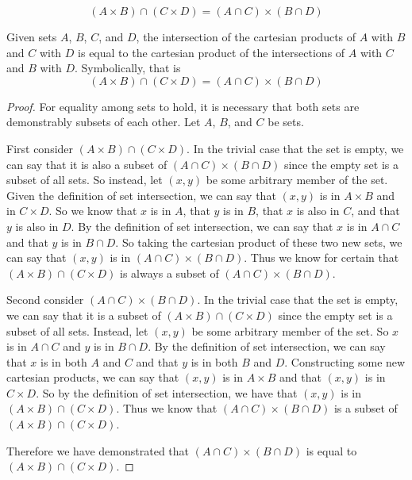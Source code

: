 \documentclass[main.tex]{subfiles}
\begin{document}
\subproblem{}\label{2n}
\[(A \times B) \cap (C \times D) = (A \cap C) \times (B \cap D)\]
\begin{thm}
	Given sets \(A\), \(B\), \(C\), and \(D\), the intersection of the
	cartesian products of \(A\) with \(B\) and \(C\) with \(D\) is equal to
	the cartesian product of the intersections of \(A\) with \(C\) and \(B\)
	with \(D\). Symbolically, that is
	\[(A \times B) \cap (C \times D) = (A \cap C) \times (B \cap D)\]
\end{thm}
\begin{proof}
	For equality among sets to hold, it is necessary that both sets are
	demonstrably subsets of each other. Let \(A\), \(B\), and \(C\) be sets.

	\medskip
	First consider \((A \times B) \cap (C \times D)\). In the trivial case
	that the set is empty, we can say that it is also a subset of
	\((A \cap C) \times (B \cap D)\) since the empty set is a subset of all
	sets. So instead, let \((x,y)\) be some arbitrary member of the set.
	Given the definition of set intersection, we can say that \((x,y)\) is
	in \(A \times B\) and in \(C \times D\). So we know that \(x\) is in
	\(A\), that \(y\) is in \(B\), that \(x\) is also in \(C\), and that
	\(y\) is also in \(D\). By the definition of set intersection, we can
	say that \(x\) is in \(A \cap C\) and that \(y\) is in \(B \cap D\).
	So taking the cartesian product of these two new sets, we can say that
	\((x,y)\) is in \((A \cap C) \times (B \cap D)\). Thus we know for
	certain that \((A \times B) \cap (C \times D)\) is always a subset of
	\((A \cap C) \times (B \cap D)\).

	\medskip
	Second consider \((A \cap C) \times (B \cap D)\). In the trivial case
	that the set is empty, we can say that it is a subset of
	\((A \times B) \cap (C \times D)\) since the empty set is a subset of
	all sets. Instead, let \((x,y)\) be some arbitrary member of the set.
	So \(x\) is in \(A \cap C\) and \(y\) is in \(B \cap D\). By the
	definition of set intersection, we can say that \(x\) is in both \(A\)
	and \(C\) and that \(y\) is in both \(B\) and \(D\). Constructing some
	new cartesian products, we can say that \((x,y)\) is in \(A \times B\)
	and that \((x,y)\) is in \(C \times D\). So by the definition of set
	intersection, we have that \((x,y)\) is in
	\((A \times B) \cap (C \times D)\). Thus we know that
	\((A \cap C) \times (B \cap D)\) is a subset of
	\((A \times B) \cap (C \times D)\).

	\medskip
	Therefore we have demonstrated that \((A \cap C) \times (B \cap D)\) is
	equal to \((A \times B) \cap (C \times D)\).
\end{proof}
\end{document}
